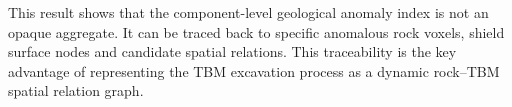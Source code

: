 This result shows that the component-level geological anomaly index is not an opaque aggregate. It can be traced back to specific anomalous rock voxels, shield surface nodes and candidate spatial relations. This traceability is the key advantage of representing the TBM excavation process as a dynamic rock--TBM spatial relation graph.
